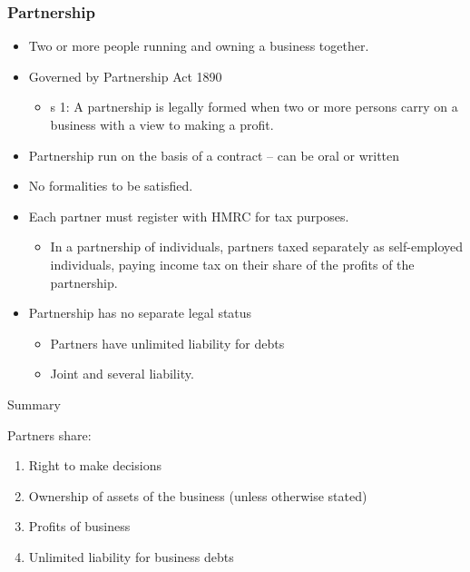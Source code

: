\documentclass[
]{article}
\providecommand{\tightlist}{%
  \setlength{\itemsep}{0pt}\setlength{\parskip}{0pt}}
\begin{document}
\hypertarget{partnership}{%
\subsubsection{Partnership}\label{partnership}}

\begin{itemize}
\tightlist
\item
  Two or more people running and owning a business together.
\item
  Governed by Partnership Act 1890

  \begin{itemize}
  \tightlist
  \item
    s 1: A partnership is legally formed when two or more persons carry
    on a business with a view to making a profit.
  \end{itemize}
\item
  Partnership run on the basis of a contract -- can be oral or written
\item
  No formalities to be satisfied.
\item
  Each partner must register with HMRC for tax purposes.

  \begin{itemize}
  \tightlist
  \item
    In a partnership of individuals, partners taxed separately as
    self-employed individuals, paying income tax on their share of the
    profits of the partnership.
  \end{itemize}
\item
  Partnership has no separate legal status

  \begin{itemize}
  \tightlist
  \item
    Partners have unlimited liability for debts
  \item
    Joint and several liability.
  \end{itemize}
\end{itemize}

Summary

Partners share:

\begin{enumerate}
\tightlist
\item
  Right to make decisions
\item
  Ownership of assets of the business (unless otherwise stated)
\item
  Profits of business
\item
  Unlimited liability for business debts
\end{enumerate}
\end{document}
